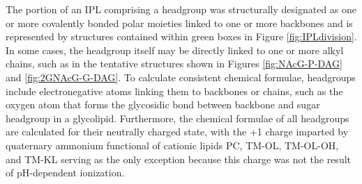 

The portion of an IPL comprising a headgroup was structurally designated as one or more covalently bonded polar moieties linked to one or more backbones and is represented by structures contained within green boxes in Figure \ref{fig:IPLdivision}. In some cases, the headgroup itself may be directly linked to one or more alkyl chains, such as in the tentative structures shown in Figures \ref{fig:NAcG-P-DAG} and \ref{fig:2GNAcG-G-DAG}. To calculate consistent chemical formulae, headgroups include electronegative atoms linking them to backbones or chains, such as the oxygen atom that forms the glycosidic bond between backbone and sugar headgroup in a glycolipid. Furthermore, the chemical formulae of all headgroups are calculated for their neutrally charged state, with the +1 charge imparted by quaternary ammonium functional of cationic lipids PC, TM-OL, TM-OL-OH, and TM-KL serving as the only exception because this charge was not the result of pH-dependent ionization.

